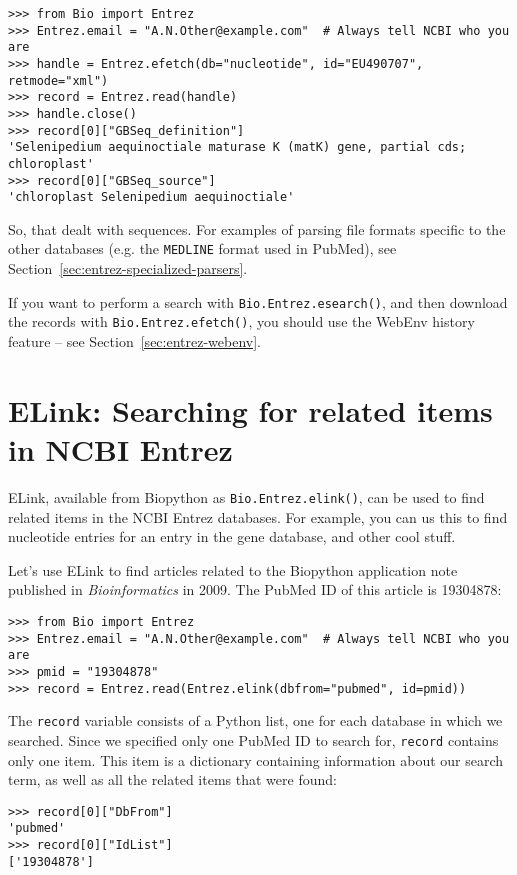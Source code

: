 \begin{verbatim}
>>> from Bio import Entrez
>>> Entrez.email = "A.N.Other@example.com"  # Always tell NCBI who you are
>>> handle = Entrez.efetch(db="nucleotide", id="EU490707", retmode="xml")
>>> record = Entrez.read(handle)
>>> handle.close()
>>> record[0]["GBSeq_definition"]
'Selenipedium aequinoctiale maturase K (matK) gene, partial cds; chloroplast'
>>> record[0]["GBSeq_source"]
'chloroplast Selenipedium aequinoctiale'
\end{verbatim}

So, that dealt with sequences. For examples of parsing file formats specific to the other databases (e.g. the \verb+MEDLINE+ format used in PubMed), see Section~\ref{sec:entrez-specialized-parsers}.

If you want to perform a search with \verb|Bio.Entrez.esearch()|, and then download the records with \verb|Bio.Entrez.efetch()|, you should use the WebEnv history feature -- see Section~\ref{sec:entrez-webenv}.

\section{ELink: Searching for related items in NCBI Entrez}
\label{sec:elink}

ELink, available from Biopython as \verb+Bio.Entrez.elink()+, can be used to find related items in the NCBI Entrez databases. For example, you can us this to find nucleotide entries for an entry in the gene database,
and other cool stuff.

Let's use ELink to find articles related to the Biopython application note published in \textit{Bioinformatics} in 2009. The PubMed ID of this article is 19304878:

\begin{verbatim}
>>> from Bio import Entrez
>>> Entrez.email = "A.N.Other@example.com"  # Always tell NCBI who you are
>>> pmid = "19304878"
>>> record = Entrez.read(Entrez.elink(dbfrom="pubmed", id=pmid))
\end{verbatim}

The \verb+record+ variable consists of a Python list, one for each database in which we searched. Since we specified only one PubMed ID to search for, \verb+record+ contains only one item. This item is a dictionary containing information about our search term, as well as all the related items that were found:

\begin{verbatim}
>>> record[0]["DbFrom"]
'pubmed'
>>> record[0]["IdList"]
['19304878']
\end{verbatim}


